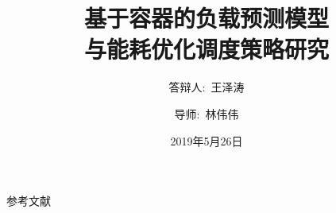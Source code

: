 \documentclass{beamer}
\title[Master Thesis Defense]
{基于容器的负载预测模型\\
与能耗优化调度策略研究}
\author[ZeTao Wang]
{答辩人:~王泽涛\inst{1} \and 导师:~林伟伟\inst{2}}
\institute[SCUT]
{
    \inst{1}
    华南理工大学\ 计算机科学与工程学院
    \and
    \inst{2}
    华南理工大学\ 计算机科学与工程学院
}
\date[May 26th, 2019]
{2019年5月26日}
\begin{document}












\begin{frame}{参考文献}
	\printbibliography
\end{frame}


\end{document}
